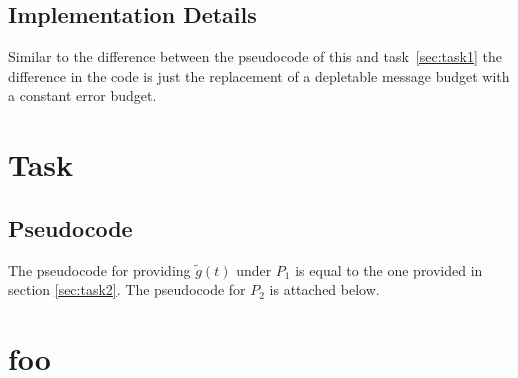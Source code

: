 \documentclass[a4paper, smallheadings,english]{scrartcl}
\begin{document}
\subsection{Implementation Details}
Similar to the difference between the pseudocode of this and task~\ref{sec:task1} the difference in the code is just the replacement of a depletable message budget with a constant error budget.

\section{Task}
\subsection{Pseudocode}
The pseudocode for providing $\widetilde{g}(t)$ under $P_{1}$ is equal to the one provided in section \ref{sec:task2}. The pseudocode for $P_{2}$ is attached below.


\section{foo}
\end{document}
